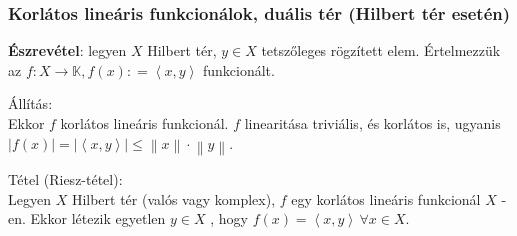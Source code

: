 \documentclass[12pt,a4paper]{scrartcl}
\newenvironment{tetel}{}{}
\newenvironment{allitas}{}{}
\begin{document}
\hypertarget{korlatos-linearis-funkcionalok-dualis-ter-hilbert-ter-eseten}{%
\subsubsection{Korlátos lineáris funkcionálok, duális tér (Hilbert tér
esetén)}\label{korlatos-linearis-funkcionalok-dualis-ter-hilbert-ter-eseten}}

\textbf{Észrevétel}: legyen \(X\) Hilbert tér, \(y \in X\) tetszőleges
rögzített elem. Értelmezzük az
\(\left. f:X\rightarrow{\mathbb{K}},f\left( x \right): = \left\langle {x,y} \right\rangle \right.\)
funkcionált.

\begin{allitas}

Állítás:\\
Ekkor \(f\) korlátos lineáris funkcionál. \(f\) linearitása triviális,
és korlátos is, ugyanis
\(\left| {f\left( x \right)} \right| = \left| \left\langle {x,y} \right\rangle \right| \leq \left\| x \right\| \cdot \left\| y \right\|\).

\end{allitas}

\begin{tetel}

Tétel (Riesz-tétel):\\
Legyen \(X\) Hilbert tér (valós vagy komplex), \(f\) egy korlátos
lineáris funkcionál \(X\) -en. Ekkor létezik egyetlen \(y \in X\) , hogy
\(f\left( x \right) = \left\langle {x,y} \right\rangle\,\forall x \in X\).

\end{tetel}
\end{document}
